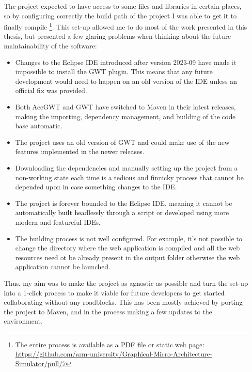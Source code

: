 \newline
The project expected to have access to some files and libraries in certain places, so by configuring correctly the build path of the project I was able to get it to finally compile \footnote{The entire process is available as a PDF file or static web page: \url{https://github.com/arm-university/Graphical-Micro-Architecture-Simulator/pull/7}}.
\newline
This set-up allowed me to do most of the work presented in this thesis, but presented a few glaring problems when thinking about the future maintainability of the software:

\begin{itemize}[label=\textendash]
	\item Changes to the Eclipse IDE introduced after version 2023-09 have made it impossible to install the GWT plugin. This means that any future development would need to happen on an old version of the IDE unless an official fix was provided.
	\item Both AceGWT and GWT have switched to Maven in their latest releases, making the importing, dependency management, and building of the code base automatic.
	\item The project uses an old version of GWT and could make use of the new features implemented in the newer releases.
	\item Downloading the dependencies and manually setting up the project from a non-working state each time is a tedious and finnicky process that cannot be depended upon in case something changes to the IDE.
	\item The project is forever bounded to the Eclipse IDE, meaning it cannot be automatically built headlessly through a script or developed using more modern and featureful IDEs.
	\item The building process is not well configured. For example, it's not possible to change the directory where the web application is compiled and all the web resources need ot be already present in the output folder otherwise the web application cannot be launched. 
\end{itemize}

Thus, my aim was to make the project as agnostic as possible and turn the set-up into a 1-click process to make it viable for future developers to get started collaborating without any roadblocks. This has been mostly achieved by porting the project to Maven, and in the process making a few updates to the environment.

